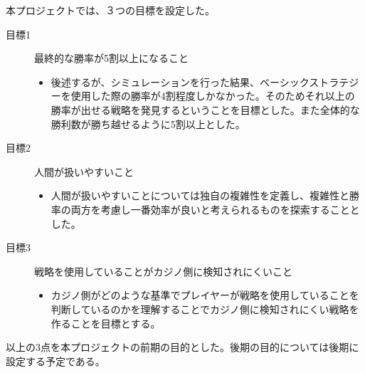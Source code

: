 本プロジェクトでは、３つの目標を設定した。
\begin{description}
\item[目標1] 最終的な勝率が5割以上になること
\begin{itemize}
\item{後述するが、シミュレーションを行った結果、ベーシックストラテジーを使用した際の勝率が4割程度しかなかった。そのためそれ以上の勝率が出せる戦略を発見するということを目標とした。また全体的な勝利数が勝ち越せるように5割以上とした。}
\end{itemize}
\item[目標2]人間が扱いやすいこと
\begin{itemize}
\item{人間が扱いやすいことについては独自の複雑性を定義し、複雑性と勝率の両方を考慮し一番効率が良いと考えられるものを探索することとした。}
\end{itemize}
\item[目標3]戦略を使用していることがカジノ側に検知されにくいこと
\begin{itemize}
\item{カジノ側がどのような基準でプレイヤーが戦略を使用していることを判断しているのかを理解することでカジノ側に検知されにくい戦略を作ることを目標とする。}
\end{itemize}
\end{description}
以上の3点を本プロジェクトの前期の目的とした。後期の目的については後期に設定する予定である。
